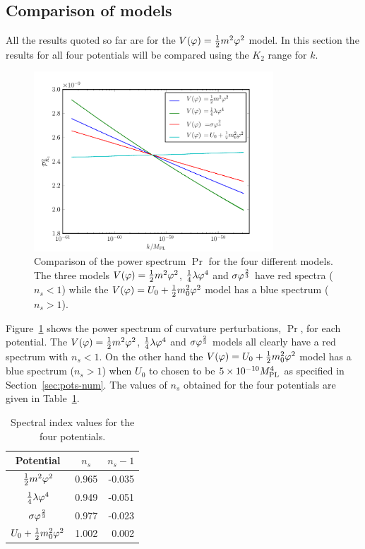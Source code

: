 \subsection{Comparison of models}
\label{sec:compare-res}
All the results quoted so far are for the $V(\varphi)=\frac{1}{2} m^2 \varphi^2$ model. In this section
the results for all four potentials will be compared using the $K_2$ range for $k$. 
% 
% 
\begin{figure}
 \centering
\includegraphics[width=0.8\textwidth]{numerical/graphs/cmp_Pr_allks-large}
\caption[Comparison of $\Pr$ for models]{Comparison of the power spectrum $\Pr$ for
the four different models. The three models $V(\varphi)=\frac{1}{2} m^2 \varphi^2$, $\frac{1}{4}\lambda\varphi^4$ and
$\sigma\varphi^{\frac{2}{3}}$ have red spectra ($n_s <1$) while the $V(\varphi) = U_0 + \frac{1}{2} m_0^2 \varphi^2$
model has a blue spectrum ($n_s>1$).}
\label{fig:cmp-Pr}
\end{figure}
% 
Figure~\ref{fig:cmp-Pr} shows the power spectrum of curvature perturbations, $\Pr$, for each
potential. The $V(\varphi)=\frac{1}{2} m^2 \varphi^2$, $\frac{1}{4}\lambda\varphi^4$ and $\sigma\varphi^{\frac{2}{3}}$ models all clearly have
a red spectrum with $n_s <1$. On the other hand the $V(\varphi)=U_0 + \frac{1}{2} m_0^2 \varphi^2$ model has a blue
spectrum ($n_s>1$) when $U_0$ to chosen to be $5\times 10^{-10}M_{\mathrm{PL}}^4$ as specified in
Section~\ref{sec:pots-num}. 
% 
The values of $n_s$ obtained for the four potentials are given in Table~\ref{table:ns-res}. 
% 
\begin{table}
\begin{center}
\begin{tabular}{ccr}
\toprule
Potential & $n_s$ & $n_s - 1$ \\
\midrule
$\frac{1}{2} m^2 \varphi^2$ & 0.965 & -0.035 \\ 
$\frac{1}{4}\lambda\varphi^4$ & 0.949 & -0.051 \\
$\sigma\varphi^{\frac{2}{3}}$ & 0.977 & -0.023 \\
$U_0 + \frac{1}{2} m_0^2 \varphi^2$ & 1.002 & 0.002 \\
\bottomrule
\end{tabular}
\caption{Spectral index values for the four potentials.}
\label{table:ns-res}
\end{center}
\end{table}


